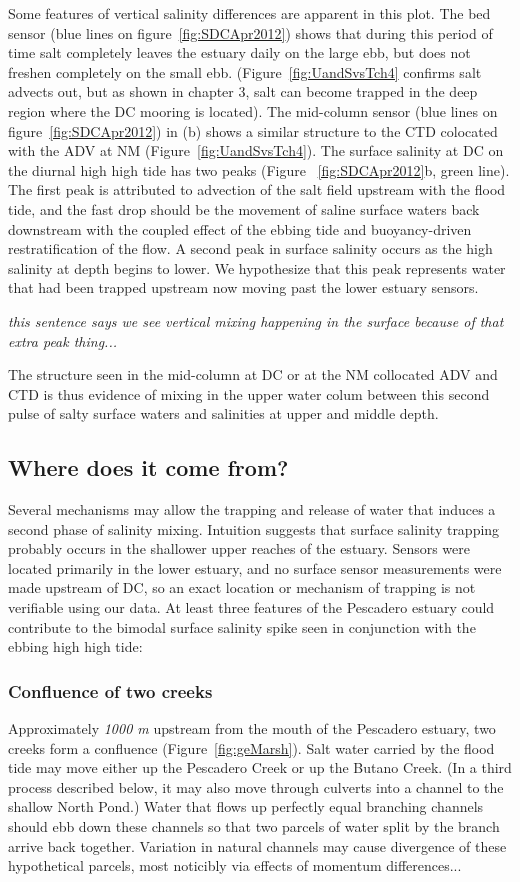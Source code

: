 Some features of vertical salinity differences are apparent in this plot. The bed sensor (blue lines on figure~\ref{fig:SDCApr2012}) shows that during this period of time salt completely leaves the estuary daily on the large ebb, but does not freshen completely on the small ebb. (Figure~\ref{fig:UandSvsTch4} confirms salt advects out, but as shown in chapter 3, salt can become trapped in the deep region where the DC mooring is located). The mid-column sensor (blue lines on figure~\ref{fig:SDCApr2012}) in (b) shows a similar structure to the CTD colocated with the ADV at NM (Figure~\ref{fig:UandSvsTch4}). The surface salinity at DC on the diurnal high high tide has two peaks (Figure ~\ref{fig:SDCApr2012}b, green line). The first peak is attributed to advection of the salt field upstream with the flood tide, and the fast drop should be the movement of saline surface waters back downstream with the coupled effect of the ebbing tide and buoyancy-driven restratification of the flow. A second peak in surface salinity occurs as the high salinity at depth begins to lower. We hypothesize that this peak represents water that had been trapped upstream now moving past the lower estuary sensors. 

\emph{this sentence says we see vertical mixing happening in the surface because of that extra peak thing... }

The structure seen in the mid-column at DC or at the NM collocated ADV and CTD is thus evidence of mixing in the upper water colum between this second pulse of salty surface waters and salinities at upper and middle depth. 

\subsection{Where does it come from?}

Several mechanisms may allow the trapping and release of water that induces a second phase of salinity mixing. Intuition suggests that surface salinity trapping probably occurs in the shallower upper reaches of the estuary. Sensors were located primarily in the lower estuary, and no surface sensor measurements were made upstream of DC, so an exact location or mechanism of trapping is not verifiable using our data. At least three features of the Pescadero estuary could contribute to the bimodal surface salinity spike seen in conjunction with the ebbing high high tide:

\subsubsection{Confluence of two creeks}
Approximately \emph{1000 m} upstream from the mouth of the Pescadero estuary, two creeks form a confluence (Figure~\ref{fig:geMarsh}). Salt water carried by the flood tide may move either up the Pescadero Creek or up the Butano Creek. (In a third process described below, it may also move through culverts into a channel to the shallow North Pond.) Water that flows up perfectly equal branching channels should ebb down these channels so that two parcels of water split by the branch arrive back together. Variation in natural channels may cause divergence of these hypothetical parcels, most noticibly via effects of momentum differences... 

